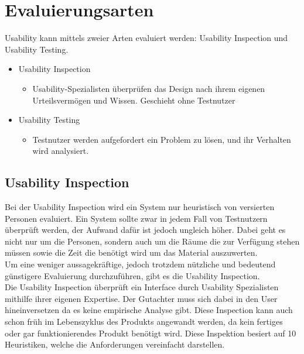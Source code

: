 \documentclass{article}
\begin{document}
	\section{Evaluierungsarten}
	Usability kann mittels zweier Arten evaluiert werden: Usability Inspection und Usability Testing.
	\begin{itemize}
		\item{Usability Inspection}
		\begin{itemize}
			\item{Usability-Spezialisten überprüfen das Design nach ihrem eigenen Urteilsvermögen und Wissen. Geschieht ohne Testnutzer}
		\end{itemize}
		\item{Usability Testing}
		\begin{itemize}
			\item{Testnutzer werden aufgefordert ein Problem zu lösen, und ihr Verhalten wird analysiert.}
		\end{itemize}
	\end{itemize}
	\subsection{Usability Inspection}
	Bei der Usability Inspection wird ein System nur heuristisch von versierten Personen evaluiert. Ein System sollte zwar in jedem Fall von Testnutzern überprüft werden, der Aufwand dafür ist jedoch ungleich höher. Dabei geht es nicht nur um die Personen, sondern auch um die Räume die zur Verfügung stehen müssen sowie die Zeit die benötigt wird um das Material auszuwerten. \\
	Um eine weniger aussagekräftige, jedoch trotzdem nützliche und bedeutend günstigere Evaluierung durchzuführen, gibt es die Usability Inspection. \\
	Die Usability Inspection überprüft ein Interface durch Usability Spezialisten mithilfe ihrer eigenen Expertise. Der Gutachter muss sich dabei in den User hineinversetzen da es keine empirische Analyse gibt. Diese Inspection kann auch schon früh im Lebenszyklus des Produkts angewandt werden, da kein fertiges oder gar funktionierendes Produkt benötigt wird. Diese Inspektion besiert auf 10 Heuristiken, welche die Anforderungen vereinfacht darstellen.
\end{document}
